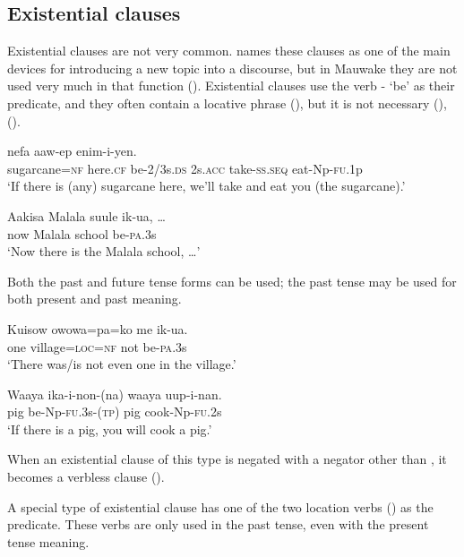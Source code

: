 \subsection{Existential clauses}
{}
Existential clauses are not very common. \citet[741]{Givon1990} names these clauses as one of the main devices for introducing a new topic into a discourse, but in Mauwake they are not used very much in that function (). Existential clauses use the verb - `be' as their predicate, and they often contain a locative phrase (), but it is not necessary (), (). 

\ea%
\label{ex:x970}
\gll {}     nefa  aaw-ep  enim-i-yen. \\
     sugarcane=\textsc{nf}  here.\textsc{cf}  be-2/3s.\textsc{ds}  2s.\textsc{acc}  take-\textsc{ss}.\textsc{seq}  eat-Np-\textsc{fu}.1p \\
\glt `If there is (any) sugarcane here, we'll take and eat you (the sugarcane).'
\z

\ea%
\label{ex:x971}
\gll Aakisa  Malala  suule  ik-ua,  {\dots} \\
     now  Malala  school  be-\textsc{pa}.3s \\
\glt `Now there is the Malala school, {\dots}'
\z

Both the past and future tense forms can be used; the past tense may be used for both present and past meaning. 

\ea%
\label{ex:x1068}
\gll Kuisow  owowa=pa=ko  me  ik-ua. \\
     one  village=\textsc{loc}=\textsc{nf}  not  be-\textsc{pa}.3s \\
\glt `There was/is not even one in the village.'
\z

\ea%
\label{ex:x1067}
\gll Waaya  ika-i-non-(na)  waaya  uup-i-nan. \\
     pig  be-Np-\textsc{fu}.3s-(\textsc{tp})  pig  cook-Np-\textsc{fu}.2s \\
\glt `If there is a pig, you will cook a pig.'
\z

When an existential clause of this type is negated with a negator other than , it becomes a verbless clause ().

A special type of existential clause has one of the two location verbs () as the predicate. These verbs are only used in the past tense, even with the present tense meaning.

